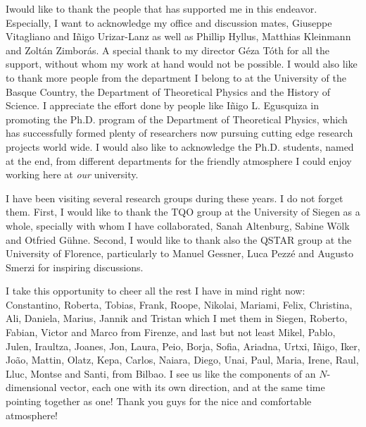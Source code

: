 \documentclass[12pt, letterpaper, twoside]{article}
\numberwithin{equation}{section}
\numberwithin{figure}{section}
\numberwithin{table}{section}
\begin{document}
\lettrine[lines=2, findent=3pt,nindent=0pt]{I}{}would like to thank the people that has supported me in this endeavor.
Especially, I want to acknowledge my office and discussion mates, Giuseppe Vitagliano and Iñigo Urizar-Lanz as well as Phillip Hyllus, Matthias Kleinmann and Zoltán Zimborás.
A special thank to my director Géza Tóth for all the support, without whom my work at hand would not be possible.
I would also like to thank more people from the department I belong to at the University of the Basque Country, the Department of Theoretical Physics and the History of Science.
I appreciate the effort done by people like Iñigo L. Egusquiza in promoting the Ph.D. program of the Department of Theoretical Physics, which has successfully formed plenty of researchers now pursuing cutting edge research projects world wide.
I would also like to acknowledge the Ph.D. students, named at the end, from different departments for the friendly atmosphere I could enjoy working here at \emph{our} university.

I have been visiting several research groups during these years. I do not forget them.
First, I would like to thank the TQO group at the University of Siegen as a whole, specially with whom I have collaborated, Sanah Altenburg, Sabine Wölk and Otfried Gühne.
Second, I would like to thank also the QSTAR group at the University of Florence, particularly to Manuel Gessner, Luca Pezz\'e and Augusto Smerzi for inspiring discussions.

I take this opportunity to cheer all the rest I have in mind right now: Constantino, Roberta, Tobias, Frank, Roope, Nikolai, Mariami, Felix, Christina, Ali, Daniela, Marius, Jannik and Tristan which I met them in Siegen, Roberto, Fabian, Victor and Marco from Firenze, and last but not least Mikel, Pablo, Julen, Iraultza, Joanes, Jon, Laura, Peio, Borja, Sofia, Ariadna, Urtxi, Iñigo, Iker, Jo\~ao, Mattin, Olatz, Kepa, Carlos, Naiara, Diego, Unai, Paul, Maria, Irene, Raul, Lluc, Montse and Santi, from Bilbao.
I see us like the components of an $N$-dimensional vector, each one with its own direction, and at the same time pointing together as one!
Thank you guys for the nice and comfortable atmosphere!

\cleardoublepage


\renewcommand{\headrulewidth}{0.5pt}
\fancyfoot[LE,RO]{\thepage}
\fancyhead[LE]{\rightmark}
\fancyhead[RO]{\leftmark}











\appendix


\cleardoublepage
\fancyhead[RO]{\leftmark}

\end{document}
